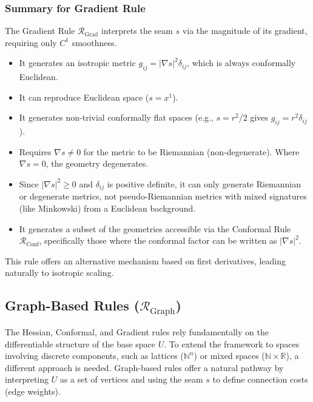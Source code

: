 \documentclass[twoside,twocolumn]{article}
\begin{document}
\subsubsection{Summary for Gradient Rule}
The Gradient Rule \( \mathcal{R}_{\text{Grad}} \) interprets the seam \( s \) via the magnitude of its gradient, requiring only \( C^1 \) smoothness.
\begin{itemize}
    \item It generates an isotropic metric \( g_{ij} = |\nabla s|^2 \delta_{ij} \), which is always conformally Euclidean.
    \item It can reproduce Euclidean space ($s=x^1$).
    \item It generates non-trivial conformally flat spaces (e.g., $s=r^2/2$ gives $g_{ij}=r^2 \delta_{ij}$).
    \item Requires $\nabla s \neq 0$ for the metric to be Riemannian (non-degenerate). Where $\nabla s = 0$, the geometry degenerates.
    \item Since $|\nabla s|^2 \ge 0$ and $\delta_{ij}$ is positive definite, it can only generate Riemannian or degenerate metrics, not pseudo-Riemannian metrics with mixed signatures (like Minkowski) from a Euclidean background.
    \item It generates a subset of the geometries accessible via the Conformal Rule $\mathcal{R}_{\text{Conf}}$, specifically those where the conformal factor can be written as $|\nabla s|^2$.
\end{itemize}
This rule offers an alternative mechanism based on first derivatives, leading naturally to isotropic scaling.


\subsection{Graph-Based Rules ($\mathcal{R}_{\text{Graph}}$)}
\setcounter{definition}{0}

The Hessian, Conformal, and Gradient rules rely fundamentally on the differentiable structure of the base space $U$. To extend the framework to spaces involving discrete components, such as lattices ($\mathbb{N}^n$) or mixed spaces ($\mathbb{N} \times \mathbb{R}$), a different approach is needed. Graph-based rules offer a natural pathway by interpreting $U$ as a set of vertices and using the seam $s$ to define connection costs (edge weights).
\end{document}
